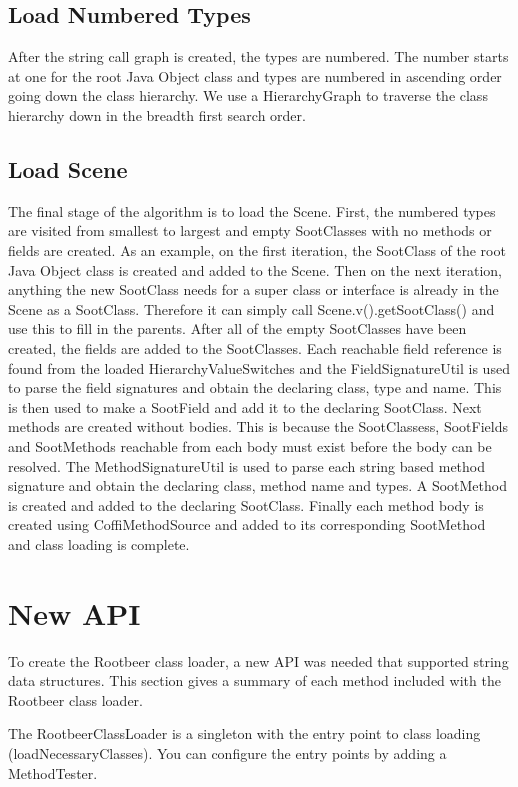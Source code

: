 \documentclass[preprint]{sigplanconf}
\begin{document}
\subsection{Load Numbered Types}
After the string call graph is created, the types are numbered. The number starts at one for the root Java Object class and types are numbered in ascending order going down the class hierarchy. We use a HierarchyGraph to traverse the class hierarchy down in the breadth first search order.

\subsection{Load Scene}
The final stage of the algorithm is to load the Scene. First, the numbered types are visited from smallest to largest and empty SootClasses with no methods or fields are created. As an example, on the first iteration, the SootClass of the root Java Object class is created and added to the Scene. Then on the next iteration, anything the new SootClass needs for a super class or interface is already in the Scene as a SootClass. Therefore it can simply call Scene.v().getSootClass() and use this to fill in the parents.
After all of the empty SootClasses have been created, the fields are added to the SootClasses. Each reachable field reference is found from the loaded HierarchyValueSwitches and the FieldSignatureUtil is used to parse the field signatures and obtain the declaring class, type and name. This is then used to make a SootField and add it to the declaring SootClass. 
Next methods are created without bodies. This is because the SootClassess, SootFields and SootMethods reachable from each body must exist before the body can be resolved. The MethodSignatureUtil is used to parse each string based method signature and obtain the declaring class, method name and types. A SootMethod is created and added to the declaring SootClass.
Finally each method body is created using CoffiMethodSource and added to its corresponding SootMethod and class loading is complete.

\section{New API}
\label{sec:api}
To create the Rootbeer class loader, a new API was needed that supported string data structures. This section gives a summary of each method included with the Rootbeer class loader.

The RootbeerClassLoader is a singleton with the entry point to class loading (loadNecessaryClasses). You can configure the entry points by adding a MethodTester.
\end{document}

